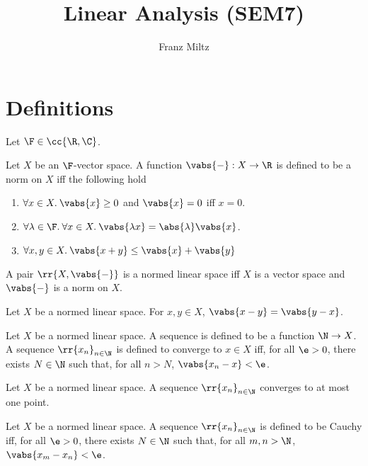 \documentclass{article}
\begin{document}
\mkthmstwounified
\title{Linear Analysis (SEM7)}
\author{Franz Miltz}
\maketitle
\tableofcontents
\pagebreak

\section{Definitions}
\label{sec:definitions}

Let $\F\in \cc{ \R,\C }$.

\begin{definition}
  \label{def:nls}
  Let $X$ be an $\F$-vector space.
  A function $ \vabs{ - } : X \to \R$ is defined to be a norm on $X$ iff the following hold
  \begin{enumerate}
    \item $\forall x\in X.\: \vabs{ x }\geq 0$ and $ \vabs{ x } = 0$ iff $x = 0$.
    \item $\forall \lambda\in\F.\:\forall x \in X.\: \vabs{ \lambda x } = \abs{ \lambda } \vabs{ x }$.
    \item $\forall x,y\in X.\: \vabs{ x + y } \leq \vabs{ x } + \vabs{ y }$
  \end{enumerate}
  A pair $ \rr{ X, \vabs{ - } }$ is a normed linear space iff $X$ is a vector space and $ \vabs{ - } $
  is a norm on $X$.
\end{definition}


\begin{theorem}
  \label{thm:symmetry}
  Let $X$ be a normed linear space. For $x,y\in X$, $ \vabs{ x - y } = \vabs{ y - x } $.
\end{theorem}


\begin{definition}
  \label{def:convergence}
  Let $X$ be a normed linear space. A sequence is defined to be a function $\N\to X$. A
  sequence $ \rr{x_n}_{n\in\N}$ is defined to converge to $x\in X$ iff, for all $\e > 0$,
  there exists $N\in\N$ such that, for all $n>N$, $ \vabs{ x_n - x } < \e$.
\end{definition}


\begin{theorem}
  \label{thm:uniquenes-of-the-limit}
  Let $X$ be a normed linear space. A sequence $ \rr{x_n}_{n\in\N}$ converges to at most one point.
\end{theorem}


\begin{definition}
  \label{def:cauchy}
  Let $X$ be a normed linear space. A sequence $ \rr{x_n}_{n\in\N}$ is defined to be Cauchy iff,
  for all $\e>0$, there exists $N\in\N$ such that, for all $m,n>\N$, $ \vabs{ x_m - x_n } < \e$.
\end{definition}
\end{document}
